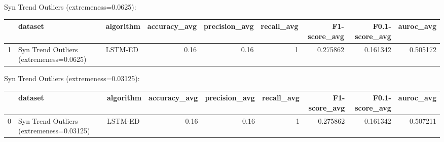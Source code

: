 Syn Trend Outliers (extremeness=0.0625):

\begin{tabular}{rllrrrrrr}
\hline
    & dataset                                 & algorithm   &   accuracy\_avg &   precision\_avg &   recall\_avg &   F1-score\_avg &   F0.1-score\_avg &   auroc\_avg \\
\hline
  1 & Syn Trend Outliers (extremeness=0.0625) & LSTM-ED     &           0.16 &            0.16 &            1 &       0.275862 &         0.161342 &    0.505172 \\
\hline
\end{tabular}

Syn Trend Outliers (extremeness=0.03125):

\begin{tabular}{rllrrrrrr}
\hline
    & dataset                                  & algorithm   &   accuracy\_avg &   precision\_avg &   recall\_avg &   F1-score\_avg &   F0.1-score\_avg &   auroc\_avg \\
\hline
  0 & Syn Trend Outliers (extremeness=0.03125) & LSTM-ED     &           0.16 &            0.16 &            1 &       0.275862 &         0.161342 &    0.507211 \\
\hline
\end{tabular}

